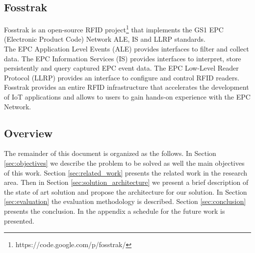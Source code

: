 \subsection{Fosstrak}
\label{sub:fosstrak}
Fosstrak is an open-source RFID project\footnote{https://code.google.com/p/fosstrak/}
that implements the GS1 EPC (Electronic Product Code) Network ALE, IS and LLRP standards.\\

The EPC Application Level Events (ALE) provides interfaces to filter and collect data.
The EPC Information Services (IS) provides interfaces to interpret, store persistently
and query captured EPC event data. The EPC Low-Level Reader Protocol (LLRP) provides an
interface to configure and control RFID readers.\\

Fosstrak provides an entire RFID infrastructure that accelerates the development of
IoT applications and allows to users to gain hands-on experience with the EPC Network.
\subsection{Overview}
\label{sub:overview}
The remainder of this document is organized as the follows. In Section \ref{sec:objectives}
we describe the problem to be solved as well the main objectives of this work. Section \ref{sec:related_work}
presents the related work in the research area. Then in Section \ref{sec:solution_architecture}
we present a brief description of the state of art solution and propose the architecture
for our solution. In Section \ref{sec:evaluation} the evaluation methodology is described.
Section \ref{sec:conclusion} presents the conclusion. In the appendix a schedule
for the future work is presented.
